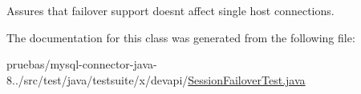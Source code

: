 Assures that failover support doesn\textquotesingle{}t affect single host connections. 

The documentation for this class was generated from the following file\+:\begin{DoxyCompactItemize}
\item 
pruebas/mysql-\/connector-\/java-\/8../src/test/java/testsuite/x/devapi/\mbox{\hyperlink{_session_failover_test_8java}{Session\+Failover\+Test.\+java}}\end{DoxyCompactItemize}

